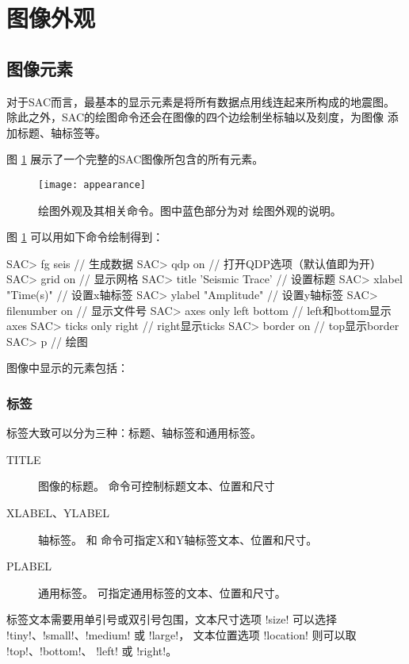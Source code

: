 \section{图像外观}
\label{sec:plot-appearance}

\subsection{图像元素}
对于SAC而言，最基本的显示元素是将所有数据点用线连起来所构成的地震图。
除此之外，SAC的绘图命令还会在图像的四个边绘制坐标轴以及刻度，为图像
添加标题、轴标签等。

图 \ref{fig:plot-appearance} 展示了一个完整的SAC图像所包含的所有元素。

\begin{figure}[H]
\centering
\texttt{[image: appearance]}
\caption[绘图外观相关命令]{绘图外观及其相关命令。图中蓝色部分为对
    绘图外观的说明。}
\label{fig:plot-appearance}
\end{figure}

图 \ref{fig:plot-appearance} 可以用如下命令绘制得到：
\begin{SACCode}
SAC> fg seis                // 生成数据
SAC> qdp on                 // 打开QDP选项（默认值即为开）
SAC> grid on                // 显示网格
SAC> title 'Seismic Trace'  // 设置标题
SAC> xlabel "Time(s)"       // 设置x轴标签
SAC> ylabel "Amplitude"     // 设置y轴标签
SAC> filenumber on          // 显示文件号
SAC> axes only left bottom  // left和bottom显示axes
SAC> ticks only right       // right显示ticks
SAC> border on              // top显示border
SAC> p                      // 绘图
\end{SACCode}

图像中显示的元素包括：
\subsubsection{标签}
标签大致可以分为三种：标题、轴标签和通用标签。
\begin{description}
\item[TITLE] 图像的标题。 命令可控制标题文本、位置和尺寸
\item[XLABEL、YLABEL] 轴标签。 和 
    命令可指定X和Y轴标签文本、位置和尺寸。
\item[PLABEL] 通用标签。 可指定通用标签的文本、位置和尺寸。
\end{description}

标签文本需要用单引号或双引号包围，文本尺寸选项 !size! 可以选择
!tiny!、!small!、!medium! 或 !large!，
文本位置选项 !location! 则可以取 !top!、!bottom!、
!left! 或 !right!。


